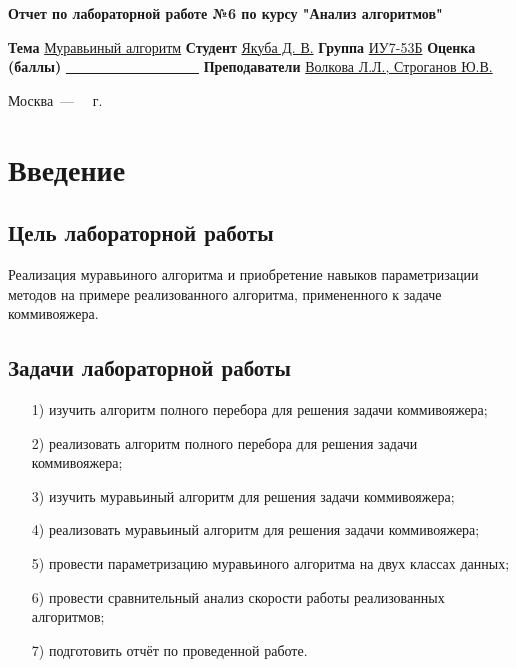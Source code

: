 \documentclass[12pt]{report}
\begin{document}
\begin{titlepage}
	
	\begin{center}
		\Large\textbf{Отчет по лабораторной работе №6 по курсу "Анализ алгоритмов"}\newline
	\end{center}
	
	\noindent\textbf{Тема} \underline{Муравьиный алгоритм}\newline\newline\newline
	\noindent\textbf{Студент} \underline{Якуба Д. В.}\newline\newline
	\noindent\textbf{Группа} \underline{ИУ7-53Б}\newline\newline
	\noindent\textbf{Оценка (баллы)} \underline{~~~~~~~~~~~~~~~~~~~}\newline\newline
	\noindent\textbf{Преподаватели} \underline{Волкова Л.Л., Строганов Ю.В.}\newline
	
	\begin{center}
		\vfill
		Москва~---~\the\year
		~г.
	\end{center}
\end{titlepage}

\setcounter{page}{2}

\tableofcontents

\newpage
\chapter*{Введение}
\section*{Цель лабораторной работы}
Реализация муравьиного алгоритма и приобретение навыков параметризации методов на примере реализованного алгоритма, примененного к задаче коммивояжера.
\section*{Задачи лабораторной работы}
\begin{enumerate}
\item[1)] изучить алгоритм полного перебора для решения задачи коммивояжера;
\item[2)] реализовать алгоритм полного перебора для решения задачи коммивояжера;
\item[3)] изучить муравьиный алгоритм для решения задачи коммивояжера;
\item[4)] реализовать муравьиный алгоритм для решения задачи коммивояжера;
\item[5)] провести параметризацию муравьиного алгоритма на двух классах данных;
\item[6)] провести сравнительный анализ скорости работы реализованных алгоритмов;
\item[7)] подготовить отчёт по проведенной работе.
\end{enumerate}
\end{document}
